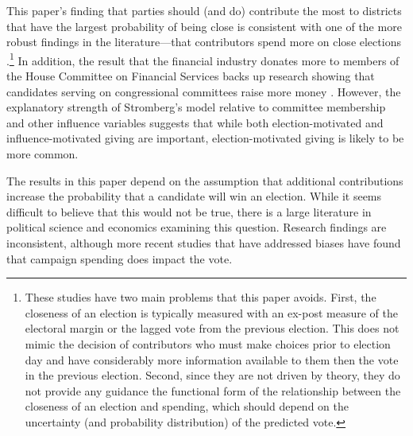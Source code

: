 \documentclass[12pt,final,fleqn]{article}
\theoremstyle{plain}
\begin{document}
This paper's finding that parties should (and do) contribute the most to districts that have the largest probability of being close is consistent with one of the more robust findings in the literature---that contributors spend more on close elections \citep{kau1982general, jacobson1985money, poole1985patterns, stratmann1991campaign}.\footnote{These studies have two main problems that this paper avoids. First, the closeness of an election is typically measured with an ex-post measure of the electoral margin or the lagged vote from the previous election. This does not mimic the decision of contributors who must make choices prior to election day and have considerably more information available to them then the vote in the previous election. Second, since they are not driven by theory, they do not provide any guidance the functional form of the relationship between the closeness of an election and spending, which should depend on the uncertainty (and probability distribution) of the predicted vote.} In addition, the result that the financial industry donates more to members of the House Committee on Financial Services backs up research showing that candidates serving on congressional committees raise more money \citep{grier1991committee, romer1994empirical, kroszner1998interest}. However, the explanatory strength of Stromberg's model relative to committee membership and other influence variables suggests that while both election-motivated and influence-motivated giving are important, election-motivated giving is likely to be more common.  

The results in this paper depend on the assumption that additional contributions increase the probability that a candidate will win an election. While it seems difficult to believe that this would not be true, there is a large literature in political science and economics examining this question. Research findings are inconsistent, although more recent studies that have addressed biases have found that campaign spending does impact the vote. 
\end{document}
